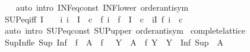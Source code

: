 \begin{isabellebody}
%
\isadelimproof
\ \ %
\endisadelimproof
%
\isatagproof
{}\isamarkupfalse%
\ {\isacharparenleft}{\kern0pt}auto\ intro{\isacharcolon}{\kern0pt}\ INF{\isacharunderscore}{\kern0pt}eq{\isacharunderscore}{\kern0pt}const\ INF{\isacharunderscore}{\kern0pt}lower\ order{\isachardot}{\kern0pt}antisym{\isacharparenright}{\kern0pt}%
\endisatagproof
{\isafoldproof}%
%
\isadelimproof
\isanewline
%
\endisadelimproof
\isanewline
{}\isamarkupfalse%
\ SUP{\isacharunderscore}{\kern0pt}eq{\isacharunderscore}{\kern0pt}iff{\isacharcolon}{\kern0pt}\ {\isachardoublequoteopen}I\ {\isasymnoteq}\ {\isacharbraceleft}{\kern0pt}{\isacharbraceright}{\kern0pt}\ {\isasymLongrightarrow}\ {\isacharparenleft}{\kern0pt}{\isasymAnd}i{\isachardot}{\kern0pt}\ i\ {\isasymin}\ I\ {\isasymLongrightarrow}\ c\ {\isasymle}\ f\ i{\isacharparenright}{\kern0pt}\ {\isasymLongrightarrow}\ {\isasymSqunion}{\isacharparenleft}{\kern0pt}f\ {\isacharbackquote}{\kern0pt}\ I{\isacharparenright}{\kern0pt}\ {\isacharequal}{\kern0pt}\ c\ {\isasymlongleftrightarrow}\ {\isacharparenleft}{\kern0pt}{\isasymforall}i{\isasymin}I{\isachardot}{\kern0pt}\ f\ i\ {\isacharequal}{\kern0pt}\ c{\isacharparenright}{\kern0pt}{\isachardoublequoteclose}\isanewline
%
\isadelimproof
\ \ %
\endisadelimproof
%
\isatagproof
{}\isamarkupfalse%
\ {\isacharparenleft}{\kern0pt}auto\ intro{\isacharcolon}{\kern0pt}\ SUP{\isacharunderscore}{\kern0pt}eq{\isacharunderscore}{\kern0pt}const\ SUP{\isacharunderscore}{\kern0pt}upper\ order{\isachardot}{\kern0pt}antisym{\isacharparenright}{\kern0pt}%
\endisatagproof
{\isafoldproof}%
%
\isadelimproof
\isanewline
%
\endisadelimproof
\isanewline
{}\isamarkupfalse%
\isanewline
\isanewline
{}\isamarkupfalse%
\ complete{\isacharunderscore}{\kern0pt}lattice\isanewline
{}\isanewline
{}\isamarkupfalse%
\ Sup{\isacharunderscore}{\kern0pt}Inf{\isacharunderscore}{\kern0pt}le{\isacharcolon}{\kern0pt}\ {\isachardoublequoteopen}Sup\ {\isacharparenleft}{\kern0pt}Inf\ {\isacharbackquote}{\kern0pt}\ {\isacharbraceleft}{\kern0pt}f\ {\isacharbackquote}{\kern0pt}\ A\ {\isacharbar}{\kern0pt}\ f\ {\isachardot}{\kern0pt}\ {\isacharparenleft}{\kern0pt}{\isasymforall}\ Y\ {\isasymin}\ A\ {\isachardot}{\kern0pt}\ f\ Y\ {\isasymin}\ Y{\isacharparenright}{\kern0pt}{\isacharbraceright}{\kern0pt}{\isacharparenright}{\kern0pt}\ {\isasymle}\ Inf\ {\isacharparenleft}{\kern0pt}Sup\ {\isacharbackquote}{\kern0pt}\ A{\isacharparenright}{\kern0pt}{\isachardoublequoteclose}\isanewline
%
\isadelimproof
\ \ %
\endisadelimproof
%
\isatagproof

\end{isabellebody}
